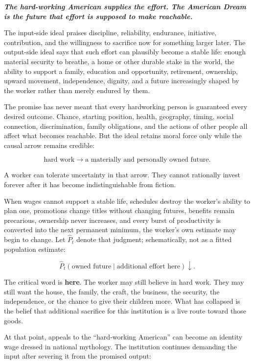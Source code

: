 \documentclass[11pt,oneside]{article}
\renewenvironment{quote}
  {\begin{tcolorbox}[
      enhanced,
      breakable,
      colback=ManifestLight,
      colframe=ManifestRule,
      boxrule=0pt,
      leftrule=3pt,
      arc=0pt,
      outer arc=0pt,
      left=10pt,right=10pt,top=8pt,bottom=8pt,
      before skip=0.8em,after skip=0.8em
    ]\itshape}
  {\end{tcolorbox}}
\begin{document}
\begin{quote}
\textbf{The hard-working American supplies the effort. The American
Dream is the future that effort is supposed to make reachable.}
\end{quote}

The input-side ideal praises discipline, reliability, endurance,
initiative, contribution, and the willingness to sacrifice now for
something larger later. The output-side ideal says that such effort can
plausibly become a stable life: enough material security to breathe, a
home or other durable stake in the world, the ability to support a
family, education and opportunity, retirement, ownership, upward
movement, independence, dignity, and a future increasingly shaped by the
worker rather than merely endured by them.

The promise has never meant that every hardworking person is guaranteed
every desired outcome. Chance, starting position, health, geography,
timing, social connection, discrimination, family obligations, and the
actions of other people all affect what becomes reachable. But the ideal
retains moral force only while the causal arrow remains credible:

\[
\text{hard work}
\longrightarrow
\text{a materially and personally owned future}.
\]

A worker can tolerate uncertainty in that arrow. They cannot rationally
invest forever after it has become indistinguishable from fiction.

When wages cannot support a stable life, schedules destroy the worker's
ability to plan one, promotions change titles without changing futures,
benefits remain precarious, ownership never increases, and every burst
of productivity is converted into the next permanent minimum, the
worker's own estimate may begin to change. Let \(\widehat P_t\) denote
that judgment; schematically, not as a fitted population estimate:

\[
\widehat P_t(\text{owned future}\mid\text{additional effort here})\downarrow.
\]

The critical word is \textbf{here}. The worker may still believe in hard
work. They may still want the house, the family, the craft, the
business, the security, the independence, or the chance to give their
children more. What has collapsed is the belief that additional
sacrifice for this institution is a live route toward those goods.

At that point, appeals to the ``hard-working American'' can become an
identity wage dressed in national mythology. The institution continues
demanding the input after severing it from the promised output:
\end{document}
